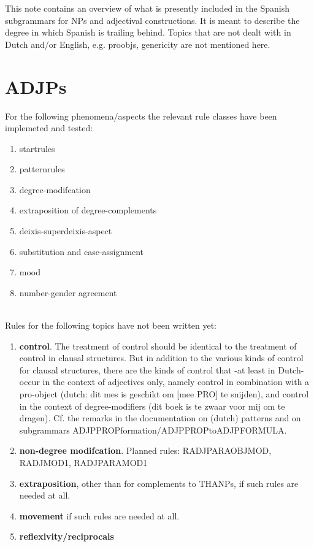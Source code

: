 \setlength{\parindent}{0in}

   \RosSupersedes{-}
   \MakeRosTitle
%
%


This note contains an overview of what is presently 
included in the Spanish subgrammars for NPs and adjectival constructions.
It is meant to describe the degree in which Spanish is trailing behind.
Topics that are not dealt with in Dutch and/or English, e.g. proobjs, 
genericity 
are not mentioned here.

\section{ADJPs}

For the following phenomena/aspects the relevant 
rule classes have been implemeted and tested:
\begin{enumerate}
  \item startrules
  \item patternrules
  \item degree-modifcation 
  \item extraposition of degree-complements
  \item deixis-superdeixis-aspect
  \item substitution and case-assignment
  \item mood
  \item number-gender agreement 
\end{enumerate}
\mbox{}\\

Rules for the following topics have not been written yet:
\begin{enumerate}
  \item {\bf control}. The treatment of control should be identical 
to the treatment of control in clausal structures. 
But in addition to the various kinds of control for clausal structures, there 
are the kinds of control that -at least in Dutch- occur in the context
of adjectives only, namely control in combination with a pro-object 
(dutch: dit mes is geschikt om [mee PRO] te snijden), and 
control in the context of degree-modifiers (dit boek is te zwaar voor mij om te 
dragen). Cf. the remarks in the documentation on (dutch) patterns and on 
subgrammars ADJPPROPformation/ADJPPROPtoADJPFORMULA.
  \item {\bf non-degree modifcation}. Planned rules: 
RADJPARAOBJMOD, RADJMOD1, RADJPARAMOD1

\item {\bf extraposition}, other than for complements to THANPs, if such rules 
are needed at all.

\item {\bf movement} if such rules are needed at all.

\item {\bf reflexivity/reciprocals}
\end{enumerate}
\mbox{}\\

